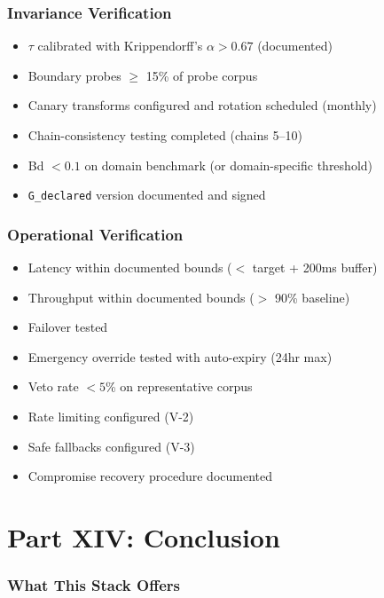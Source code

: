 \documentclass[11pt,letterpaper]{article}
\theoremstyle{definition}
\theoremstyle{remark}
\begin{document}
\section{Invariance Verification}
\begin{itemize}
\item $\tau$ calibrated with Krippendorff's $\alpha > 0.67$ (documented)
\item Boundary probes $\geq$ 15\% of probe corpus
\item Canary transforms configured and rotation scheduled (monthly)
\item Chain-consistency testing completed (chains 5--10)
\item Bd $< 0.1$ on domain benchmark (or domain-specific threshold)
\item \texttt{G\_declared} version documented and signed
\end{itemize}

\section{Operational Verification}
\begin{itemize}
\item Latency within documented bounds ($<$ target + 200ms buffer)
\item Throughput within documented bounds ($>$ 90\% baseline)
\item Failover tested
\item Emergency override tested with auto-expiry (24hr max)
\item Veto rate $< 5$\% on representative corpus
\item Rate limiting configured (V-2)
\item Safe fallbacks configured (V-3)
\item Compromise recovery procedure documented
\end{itemize}



\part*{Part XIV: Conclusion}

\section{What This Stack Offers}
\end{document}
